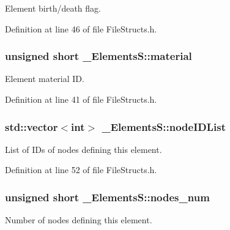 Element birth/death flag. 



Definition at line 46 of file File\+Structs.\+h.

\subsubsection[{\texorpdfstring{material}{material}}]{\setlength{\rightskip}{0pt plus 5cm}unsigned short \+\_\+\+Elements\+S\+::material}\hypertarget{struct___elements_s_ac64ee48e51f13b1e7aabb9b6a48cb726}{}\label{struct___elements_s_ac64ee48e51f13b1e7aabb9b6a48cb726}


Element material ID. 



Definition at line 41 of file File\+Structs.\+h.

\subsubsection[{\texorpdfstring{node\+I\+D\+List}{nodeIDList}}]{\setlength{\rightskip}{0pt plus 5cm}std\+::vector$<$int$>$ \+\_\+\+Elements\+S\+::node\+I\+D\+List}\hypertarget{struct___elements_s_a9e3631ebed48f8c5869f08f0970c251c}{}\label{struct___elements_s_a9e3631ebed48f8c5869f08f0970c251c}


List of I\+Ds of nodes defining this element. 



Definition at line 52 of file File\+Structs.\+h.

\subsubsection[{\texorpdfstring{nodes\+\_\+num}{nodes_num}}]{\setlength{\rightskip}{0pt plus 5cm}unsigned short \+\_\+\+Elements\+S\+::nodes\+\_\+num}\hypertarget{struct___elements_s_a49bec774408021bd15702208237fb17f}{}\label{struct___elements_s_a49bec774408021bd15702208237fb17f}


Number of nodes defining this element. 



